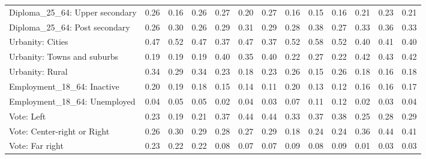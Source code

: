 \begin{tabular}[t]{lllllllllllll}
Diploma\_25\_64: Upper secondary & 0.26 & 0.16 & 0.26 & 0.27 & 0.20 & 0.27 & 0.16 & 0.15 & 0.16 & 0.21 & 0.23 & 0.21\\
Diploma\_25\_64: Post secondary & 0.26 & 0.30 & 0.26 & 0.29 & 0.31 & 0.29 & 0.28 & 0.38 & 0.27 & 0.33 & 0.36 & 0.33\\
\addlinespace
Urbanity: Cities & 0.47 & 0.52 & 0.47 & 0.37 & 0.47 & 0.37 & 0.52 & 0.58 & 0.52 & 0.40 & 0.41 & 0.40\\
Urbanity: Towns and suburbs & 0.19 & 0.19 & 0.19 & 0.40 & 0.35 & 0.40 & 0.22 & 0.27 & 0.22 & 0.42 & 0.43 & 0.42\\
Urbanity: Rural & 0.34 & 0.29 & 0.34 & 0.23 & 0.18 & 0.23 & 0.26 & 0.15 & 0.26 & 0.18 & 0.16 & 0.18\\
\addlinespace
Employment\_18\_64: Inactive & 0.20 & 0.19 & 0.18 & 0.15 & 0.14 & 0.11 & 0.20 & 0.13 & 0.12 & 0.16 & 0.16 & 0.17\\
Employment\_18\_64: Unemployed & 0.04 & 0.05 & 0.05 & 0.02 & 0.04 & 0.03 & 0.07 & 0.11 & 0.12 & 0.02 & 0.03 & 0.04\\
\addlinespace
Vote: Left & 0.23 & 0.19 & 0.21 & 0.37 & 0.44 & 0.44 & 0.33 & 0.37 & 0.38 & 0.25 & 0.28 & 0.29\\
Vote: Center-right or Right & 0.26 & 0.30 & 0.29 & 0.28 & 0.27 & 0.29 & 0.18 & 0.24 & 0.24 & 0.36 & 0.44 & 0.41\\
Vote: Far right & 0.23 & 0.22 & 0.22 & 0.08 & 0.07 & 0.07 & 0.09 & 0.08 & 0.09 & 0.01 & 0.03 & 0.03\\
\bottomrule
\end{tabular}